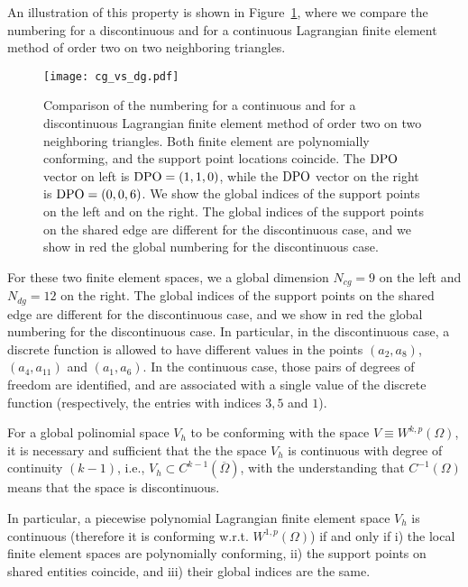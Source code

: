 An illustration of this property is shown in Figure~\ref{fig:cg_vs_dg}, where we compare the numbering for a discontinuous and for a continuous Lagrangian finite element method of order two on two neighboring triangles.

\begin{figure}[!htb]
\centering
\texttt{[image: cg\_vs\_dg.pdf]}
\caption{Comparison of the numbering for a continuous and for a discontinuous Lagrangian finite element method of order two on two neighboring triangles. Both finite element are polynomially conforming, and the support point locations coincide. The $\mathrm{DPO}$ vector on left is $\mathrm{DPO} = (1, 1, 0)$, while the $\mathrm{DPO}$ vector on the right is $\mathrm{DPO} = (0, 0, 6)$. We show the global indices of the support points on the left and on the right. The global indices of the support points on the shared edge are different for the discontinuous case, and we show in red the global numbering for the discontinuous case.}
\label{fig:cg_vs_dg}
\end{figure}

For these two finite element spaces, we a global dimension $N_{cg} = 9$ on the left and $N_{dg} = 12$ on the right. The global indices of the support points on the shared edge are different for the discontinuous case, and we show in red the global numbering for the discontinuous case. In particular, in the discontinuous case, a discrete function is allowed to have different values in the points $(a_2, a_8)$, $(a_4, a_{11})$ and $(a_1, a_6)$. In the continuous case, those pairs of degrees of freedom are identified, and are associated with a single value of the discrete function (respectively, the entries with indices $3,5$ and $1$).

\begin{theorem}
  For a global polinomial space $V_h$ to be conforming with the space $V \equiv W^{k,p}(\Omega)$, it is necessary and sufficient that the the space $V_h$ is continuous with degree of continuity $(k-1)$, i.e., $V_h \subset C^{k-1}(\overline{\Omega})$, with the understanding that $C^{-1}(\Omega)$ means that the space is discontinuous.
  
  In particular, a piecewise polynomial Lagrangian finite element space $V_h$ is continuous (therefore it is conforming w.r.t. $W^{1,p}(\Omega)$) if and only if i) the local finite element spaces are polynomially conforming, ii) the support points on shared entities coincide, and iii) their global indices are the same.
\end{theorem}